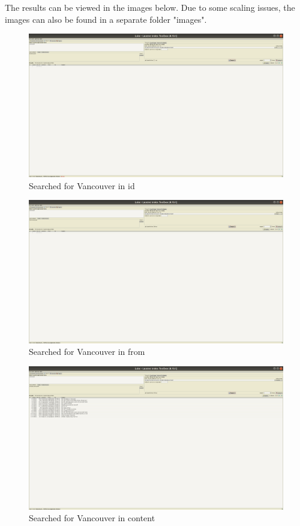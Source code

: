 \documentclass{article}
\begin{document}
The results can be viewed in the images below. Due to some scaling issues, the images can also be found in a separate folder "images".
\begin{figure}[h]

    \centering
    \includegraphics[width=\textwidth]{id}
    \caption{Searched for Vancouver in id}
    \label{fig:id}
\end{figure}

\begin{figure}[h]
    \centering
    \includegraphics[width=\textwidth]{from}
    \caption{Searched for Vancouver in from}
    \label{fig:from}
\end{figure}

\begin{figure}[h]
    \centering
    \includegraphics[width=\textwidth]{content}
    \caption{Searched for Vancouver in content}
    \label{fig:content}
\end{figure}
\end{document}

